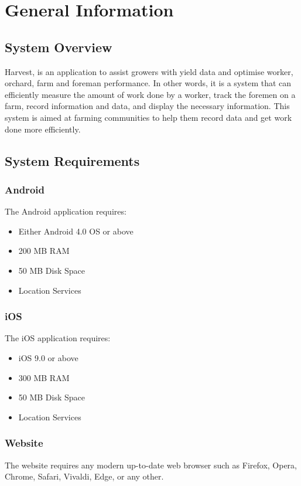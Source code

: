 \documentclass[11pt]{article}
\begin{document}
\newpage
{}
\tableofcontents
\newpage
\listoffigures

\newpage
{}

\section{General Information}
\subsection{System Overview}
Harvest, is an application to assist growers with yield data and optimise worker, orchard, farm and foreman performance. In other words, it is a system that can efficiently measure the amount of work done by a worker, track the foremen on a farm, record information and data, and display the necessary information. This system is aimed at farming communities to help them record data and get work done more efficiently.

\subsection{System Requirements}
\subsubsection{Android}
The Android application requires:
\begin{itemize}
 \item Either Android 4.0 OS or above
\item 200 MB RAM
\item 50 MB Disk Space	
 \item Location Services
\end{itemize}
\subsubsection{iOS}
The iOS application requires:
\begin{itemize}
 \item iOS 9.0 or above
 \item 300 MB RAM
 \item 50 MB Disk Space	
 \item Location Services
\end{itemize}
\subsubsection{Website}
The website requires any modern up-to-date web browser such as Firefox, Opera, Chrome, Safari, Vivaldi, Edge, or any other.
\end{document}
